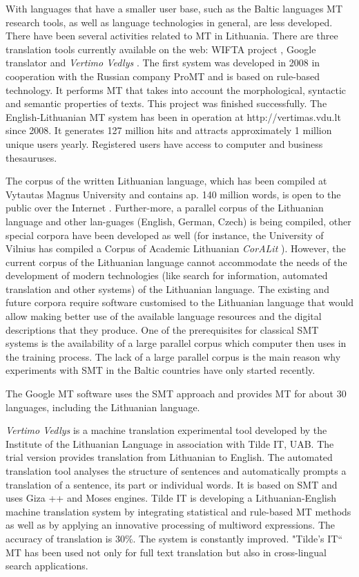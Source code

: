 \documentclass[]{../metanetpaper}
\begin{document}
\begin{multicols}{2}
    With languages that have a smaller user base, such as the Baltic languages MT research tools, as well as language technologies in general, are less developed. There have been several activities related to MT in Lithuania. There are three translation tools currently available on the web: WIFTA project \cite{vertvdu},  Google translator and \textit{Vertimo Vedlys} \cite{mvlab}.  The first system was developed in 2008 in cooperation with the Russian company ProMT and is based on rule-based technology. It performs MT that takes into account the morphological, syntactic and semantic properties of texts. This project was finished successfully. The English-Lithuanian MT system has been in operation at http://vertimas.vdu.lt since 2008. It generates 127 million hits and attracts approximately 1 million unique users yearly. Registered users have access to computer and business thesauruses.

    The corpus of the written Lithuanian language, which has been compiled at Vytautas Magnus University and contains ap. 140 million words, is open to the public over the Internet \cite{tekstynas}.  Further-more, a parallel corpus of the Lithuanian language and other lan-guages (English, German, Czech) is being compiled, other special corpora have been developed as well (for instance, the University of Vilnius has compiled a Corpus of Academic Lithuanian \textit{CorALit} \cite{coralit}). However, the current corpus of the Lithuanian language cannot accommodate the needs of the development of modern technologies (like search for information, automated translation and other systems) of the Lithuanian language. The existing and future corpora require software customised to the Lithuanian language that would allow making better use of the available language resources and the digital descriptions that they produce. One of the prerequisites for classical SMT systems is the  availability of a large parallel corpus which computer then uses in the training process. The lack of a large parallel corpus is the main reason why experiments with SMT in the Baltic countries have only started recently.  

The Google MT software uses the SMT approach and provides MT for about 30 languages, including the Lithuanian language.

\textit{Vertimo Vedlys } is a machine translation experimental tool developed by the Institute of the Lithuanian Language in association with Tilde IT, UAB. The trial version provides translation from Lithuanian to English. The automated translation tool analyses the structure of sentences and automatically prompts a translation of a sentence, its part or individual words. It is based on SMT and uses Giza ++ and Moses engines. Tilde IT is developing a Lithuanian-English machine translation system by integrating statistical and rule-based MT methods as well as by applying an innovative processing of multiword expressions. The accuracy of translation is 30\%. The system is constantly improved. "Tilde's IT“ MT has been used not only for full text translation but also in cross-lingual search applications.


\end{multicols}
\end{document}
